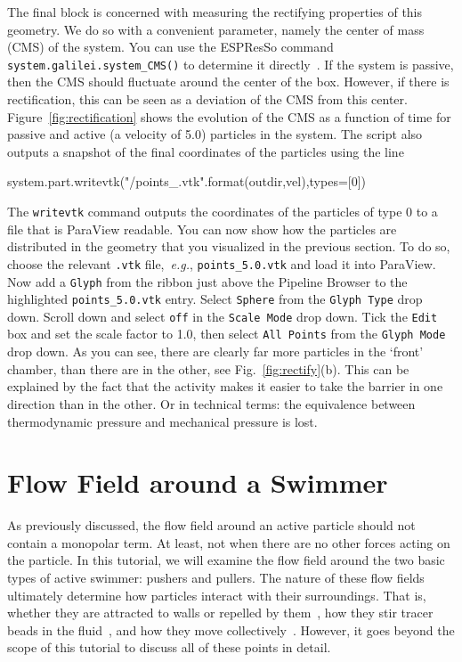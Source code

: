 \documentclass[aip,jcp,reprint,a4paper,onecolumn,amsmath]{revtex4-1}
\newcommand\code{\lstinline}
\newcommand{\es}{\mbox{\textsf{ESPResSo}}\xspace}
\newcommand\codees{\lstinline[language=python]}
\begin{document}
The final block is concerned with measuring the rectifying properties of this
geometry. We do so with a convenient parameter, namely the center of mass (CMS)
of the system. You can use the \es{} command
\codees{system.galilei.system_CMS()} to determine it directly~\cite{UG}. If the
system is passive, then the CMS should fluctuate around the center of the box.
However, if there is rectification, this can be seen as a deviation of the CMS
from this center. Figure~\ref{fig:rectification} shows the evolution of the CMS
as a function of time for passive and active (a velocity of 5.0) particles in
the system. The script also outputs a snapshot of the final coordinates of the
particles using the line
\begin{espresso}
system.part.writevtk("{}/points_{}.vtk".format(outdir,vel),types=[0])
\end{espresso}
The \codees{writevtk} command outputs the coordinates of the particles of type
0 to a file that is ParaView readable. You can now show how the particles are
distributed in the geometry that you visualized in the previous section. To do
so, choose the relevant \code{.vtk} file,~\textit{e.g.}, \code{points_5.0.vtk}
and load it into ParaView. Now add a \code{Glyph} from the ribbon just above
the Pipeline Browser to the highlighted \code{points_5.0.vtk} entry. Select
\code{Sphere} from the \code{Glyph Type} drop down. Scroll down and select
\code{off} in the \code{Scale Mode} drop down. Tick the \code{Edit} box and set
the scale factor to 1.0, then select \code{All Points} from the
\code{Glyph Mode} drop down. As you can see, there are clearly far more
particles in the `front' chamber, than there are in the other, see
Fig.~\ref{fig:rectify}(b). This can be explained by the fact that the activity
makes it easier to take the barrier in one direction than in the other. Or in
technical terms: the equivalence between thermodynamic pressure and mechanical
pressure is lost.

\section{\label{sec:flow}Flow Field around a Swimmer}

As previously discussed, the flow field around an active particle should not
contain a monopolar term. At least, not when there are no other forces acting
on the particle. In this tutorial, we will examine the flow field around the
two basic types of active swimmer: pushers and pullers. The nature of these
flow fields ultimately determine how particles interact with their
surroundings. That is, whether they are attracted to walls or repelled by
them~\cite{Spagnolie_12}, how they stir tracer beads in the
fluid~\cite{Morozov_14}, and how they move collectively~\cite{Zoettl_14}.
However, it goes beyond the scope of this tutorial to discuss all of these
points in detail.
\end{document}
